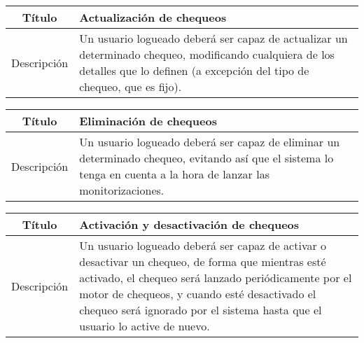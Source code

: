 \begin{center}
  
  \begin{tabularx}{\textwidth}{|c|X|}
    \hline
    Título & Actualización de chequeos \\

    \hline

    Descripción & Un usuario logueado deberá ser capaz de actualizar un
    determinado chequeo, modificando cualquiera de los detalles que lo definen
    (a excepción del tipo de chequeo, que es fijo). \\

    \hline
  \end{tabularx}
\end{center}

\begin{center}
  
  \begin{tabularx}{\textwidth}{|c|X|}
    \hline
    Título & Eliminación de chequeos \\

    \hline

    Descripción & Un usuario logueado deberá ser capaz de eliminar un
    determinado chequeo, evitando así que el sistema lo tenga en cuenta a la
    hora de lanzar las monitorizaciones. \\

    \hline
  \end{tabularx}
\end{center}

\begin{center}
  
  \begin{tabularx}{\textwidth}{|c|X|}
    \hline
    Título & Activación y desactivación de chequeos \\

    \hline

    Descripción & Un usuario logueado deberá ser capaz de activar o desactivar
    un chequeo, de forma que mientras esté activado, el chequeo será lanzado
    periódicamente por el motor de chequeos, y cuando esté desactivado el
    chequeo será ignorado por el sistema hasta que el usuario lo active de
    nuevo. \\

    \hline
  \end{tabularx}
\end{center}

